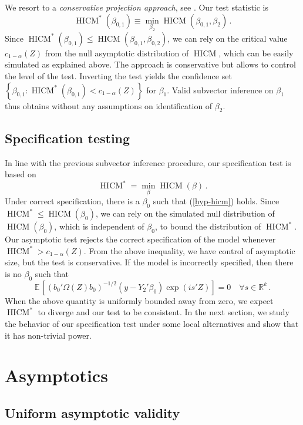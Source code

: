 \documentclass[12pt]{article}
\newcommand{\E}{\operatorname{E}}
\newcommand{\1}{\mathbf{1}}
\newcommand{\HICM}{\operatorname{HICM}}
\def\E{\mathbb{E}\,}
\begin{document}
We resort  to a {\em conservative projection approach}, see
  \cite{Dufour1997}. Our test statistic is
\[
\HICM^*(\beta_{0,1})
\equiv \min_{\beta_{2}} \HICM(\beta_{0,1},\beta_2)
\, .
\]
Since $\HICM^*(\beta_{0,1}) \leq \HICM(\beta_{0,1},\beta_{0,2})$, we
can rely on the critical value $c_{1-\alpha}(Z)$ from the null
asymptotic distribution of $\HICM$, which can be easily simulated as
explained above. The approach is conservative but allows to control
the level of the test.  Inverting the test yields the confidence set
$\left\{ \beta_{0,1} : \HICM^*(\beta_{0,1}) < c_{1-\alpha}(Z)
\right\}$ for $\beta_1$.
Valid subvector inference on $\beta_1$ thus obtains without any
assumptions on identification  of $\beta_2$.

\subsection{Specification testing} \label{sub:specif test}

In line with the previous subvector inference procedure, our
specification test is based on
\[
\HICM^* = \min_{\beta} \HICM(\beta)
\, .
\]
Under correct specification, there is a $\beta_0$ such that
(\ref{hyp-hicm}) holds. Since $\HICM^* \leq \HICM(\beta_0)$,
we can rely on the simulated null distribution of $\HICM(\beta_0)$, which
is independent of $\beta_0$, to bound the distribution of $\HICM^*$.
Our asymptotic test rejects the correct specification of the model whenever
$\HICM^* > c_{1-\alpha}(Z)$. From the above inequality, we have
control of asymptotic size, but the test is conservative.
If the model is incorrectly specified, then there is no $\beta_0$ such that
\[
\E \left[ (b_0' \Omega(Z) b_0)^{-1/2}   \left( y - Y_{2}'\beta_0
\right) \exp( i s'Z) \right] = 0
\quad \forall s\in\mathbb{R}^k
\, .
\]
When the above quantity is uniformly bounded away from zero, we expect
$\HICM^*$ to diverge and our test to be consistent. In the next
section, we study the behavior of our specification test under some
local alternatives and show that it has non-trivial power.


\section{Asymptotics}\label{sec.asy}

\subsection{Uniform asymptotic validity}
\end{document}

